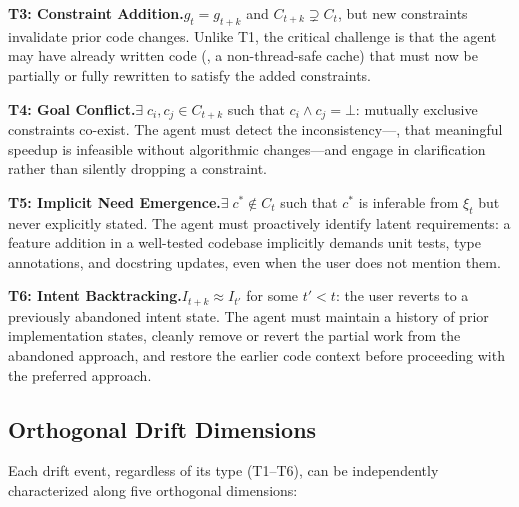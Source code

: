 \textbf{T3: Constraint Addition.}\quad $g_t = g_{t+k}$ and $C_{t+k} \supsetneq C_t$, but new constraints invalidate prior code changes. Unlike T1, the critical challenge is that the agent may have already written code (\eg, a non-thread-safe cache) that must now be partially or fully rewritten to satisfy the added constraints.

\textbf{T4: Goal Conflict.}\quad $\exists\; c_i, c_j \in C_{t+k}$ such that $c_i \wedge c_j = \bot$: mutually exclusive constraints co-exist. The agent must detect the inconsistency---\eg, that meaningful speedup is infeasible without algorithmic changes---and engage in clarification rather than silently dropping a constraint.

\textbf{T5: Implicit Need Emergence.}\quad $\exists\; c^* \notin C_t$ such that $c^*$ is inferable from $\xi_t$ but never explicitly stated. The agent must proactively identify latent requirements: a feature addition in a well-tested codebase implicitly demands unit tests, type annotations, and docstring updates, even when the user does not mention them.

\textbf{T6: Intent Backtracking.}\quad $I_{t+k} \approx I_{t'}$ for some $t' < t$: the user reverts to a previously abandoned intent state. The agent must maintain a history of prior implementation states, cleanly remove or revert the partial work from the abandoned approach, and restore the earlier code context before proceeding with the preferred approach.

\subsection{Orthogonal Drift Dimensions}
\label{sec:dimensions}

Each drift event, regardless of its type (T1--T6), can be independently characterized along five orthogonal dimensions:

